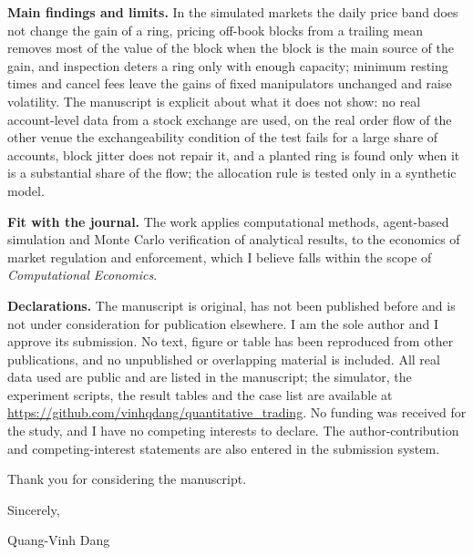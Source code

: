 \documentclass[10.5pt,a4paper]{article}
\begin{document}
\textbf{Main findings and limits.} In the simulated markets the daily price band does not change the gain of a ring, pricing off-book blocks from a trailing mean removes most of the value of the block when the block is the main source of the gain, and inspection deters a ring only with enough capacity; minimum resting times and cancel fees leave the gains of fixed manipulators unchanged and raise volatility. The manuscript is explicit about what it does not show: no real account-level data from a stock exchange are used, on the real order flow of the other venue the exchangeability condition of the test fails for a large share of accounts, block jitter does not repair it, and a planted ring is found only when it is a substantial share of the flow; the allocation rule is tested only in a synthetic model.

\textbf{Fit with the journal.} The work applies computational methods, agent-based simulation and Monte Carlo verification of analytical results, to the economics of market regulation and enforcement, which I believe falls within the scope of \emph{Computational Economics}.

\textbf{Declarations.} The manuscript is original, has not been published before and is not under consideration for publication elsewhere. I am the sole author and I approve its submission. No text, figure or table has been reproduced from other publications, and no unpublished or overlapping material is included. All real data used are public and are listed in the manuscript; the simulator, the experiment scripts, the result tables and the case list are available at \url{https://github.com/vinhqdang/quantitative_trading}. No funding was received for the study, and I have no competing interests to declare. The author-contribution and competing-interest statements are also entered in the submission system.

Thank you for considering the manuscript.

Sincerely,

Quang-Vinh Dang
\end{document}
